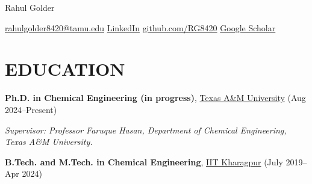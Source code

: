 \documentclass[11pt,letterpaper,sans]{moderncv}
\makeatletter
\newenvironment{cvbodyblock}{\par\begingroup}{\par\endgroup}
\newcommand{\cvsection}[1]{\par\Needspace{3\baselineskip}\vspace{-0.3em}\section{#1}\vspace{-0.25em}}
\newcommand{\cvfullname}{Rahul Golder}
\newcommand{\cvemail}{rahulgolder8420@tamu.edu}
\newcommand{\cvlinkedinurl}{https://www.linkedin.com/in/rahul-golder-49b13920a}
\newcommand{\cvscholarurl}{https://scholar.google.com/citations?user=CX03tXEAAAAJ}
\newcommand{\cvgithuburl}{https://github.com/RG8420}
\makeatother
\begin{document}
\justifying
\begin{center}
{\fontsize{30}{36}\selectfont\cvfullname}\par
\vspace{0.35em}
{\small\href{mailto:\cvemail}{\cvemail}\enspace\textbar\enspace
\href{\cvlinkedinurl}{LinkedIn}\enspace\textbar\enspace
\href{\cvgithuburl}{github.com/RG8420}\enspace\textbar\enspace
\href{\cvscholarurl}{Google Scholar}}\par
\end{center}
\vspace{-0.6em}

\cvsection{EDUCATION}
\begin{cvbodyblock}\small

\textbf{Ph.D. in Chemical Engineering (in progress)}, \href{https://www.tamu.edu/}{Texas A\&M University} (Aug 2024--Present)\par
\textit{Supervisor: Professor Faruque Hasan, Department of Chemical Engineering, Texas A\&M University.}\par
\textbf{B.Tech. and M.Tech. in Chemical Engineering}, \href{https://www.iitkgp.ac.in/}{IIT Kharagpur} (July 2019--Apr 2024)
\end{cvbodyblock}\vspace{0.20em}
\end{document}
